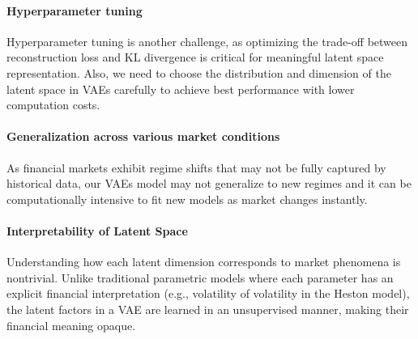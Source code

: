 \documentclass{article}
\begin{document}
\paragraph{Hyperparameter tuning} Hyperparameter tuning is another challenge, as optimizing the trade-off between reconstruction loss and KL divergence is critical for meaningful latent space representation. Also, we need to choose the distribution and dimension of the latent space in VAEs carefully to achieve best performance with lower computation costs.

\paragraph{Generalization across various market conditions}
 As financial markets exhibit regime shifts that may not be fully captured by historical data, our VAEs model may not generalize to new regimes and it can be computationally intensive to fit new models as market changes instantly.

\paragraph{Interpretability of Latent Space}
Understanding how each latent dimension corresponds to market phenomena is nontrivial. Unlike traditional parametric models where each parameter has an explicit financial interpretation (e.g., volatility of volatility in the Heston model), the latent factors in a VAE are learned in an unsupervised manner, making their financial meaning opaque.
\end{document}
